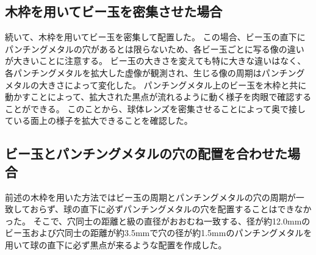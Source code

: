 
\subsection{木枠を用いてビー玉を密集させた場合}
\label{SSWoodframe}


続いて、木枠を用いてビー玉を密集して配置した\figref{}。
この場合、ビー玉の直下にパンチングメタルの穴があるとは限らないため、各ビー玉ごとに写る像の違いが大きいことに注意する。
ビー玉の大きさを変えても特に大きな違いはなく、各パンチングメタルを拡大した虚像が観測され、生じる像の周期はパンチングメタルの大きさによって変化した\figref{}。
パンチングメタル上のビー玉を木枠と共に動かすことによって、拡大された黒点が流れるように動く様子を肉眼で確認することができる。
このことから、球体レンズを密集させることによって奥で接している面上の様子を拡大できることを確認した。

\subsection{ビー玉とパンチングメタルの穴の配置を合わせた場合}
\label{SSMarbleOnHole}
前述の木枠を用いた方法ではビー玉の周期とパンチングメタルの穴の周期が一致しておらず、球の直下に必ずパンチングメタルの穴を配置することはできなかった。
そこで、穴同士の距離と級の直径がおおむね一致する、径が約12.0mmのビー玉および穴同士の距離が約3.5mmで穴の径が約1.5mmのパンチングメタルを用いて球の直下に必ず黒点が来るような配置を作成した\figref{}。


